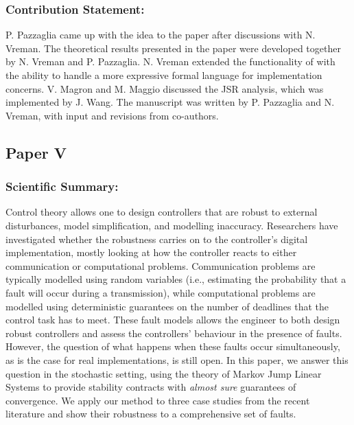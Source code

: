 \subsubsection*{Contribution Statement:}%
%
P. Pazzaglia came up with the idea to the paper after discussions with N. Vreman.
The theoretical results presented in the paper were developed together by N. Vreman and P. Pazzaglia.
N. Vreman extended the functionality of \tool{} with the ability to handle a more expressive formal language for implementation concerns.
V. Magron and M. Maggio discussed the JSR analysis, which was implemented by J. Wang.
The manuscript was written by P. Pazzaglia and N. Vreman, with input and revisions from co-authors.


\subsection*{Paper V}%
%
\begin{quote}
\end{quote}


\subsubsection*{Scientific Summary:}%
%
Control theory allows one to design controllers that are robust to external disturbances, model simplification, and modelling inaccuracy.
Researchers have investigated whether the robustness carries on to the controller's digital implementation, mostly looking at how the controller reacts to either communication or computational problems.
Communication problems are typically modelled using random variables (i.e., estimating the probability that a fault will occur during a transmission), while computational problems are modelled using deterministic guarantees on the number of deadlines that the control task has to meet.
These fault models allows the engineer to both design robust controllers and assess the controllers' behaviour in the presence of faults.
However, the question of what happens when these faults occur simultaneously, as is the case for real implementations, is still open.
In this paper, we answer this question in the stochastic setting, using the theory of Markov Jump Linear Systems to provide stability contracts with \emph{almost sure} guarantees of convergence.
We apply our method to three case studies from the recent literature and show their robustness to a comprehensive set of faults.

